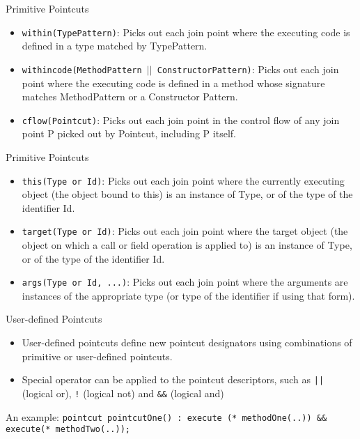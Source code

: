 \documentclass[11pt]{beamer}
\begin{document}
\begin{frame}{Primitive Pointcuts}
  \begin{itemize}
    \item \texttt{within(TypePattern)}:
    Picks out each join point where the executing code is defined in a type matched by TypePattern. 
    \item \texttt{withincode(MethodPattern $||$ ConstructorPattern)}:
    Picks out each join point where the executing code is defined in a method whose signature matches MethodPattern or a Constructor Pattern. 
    \item \texttt{cflow(Pointcut)}:
    Picks out each join point in the control flow of any join point P picked out by Pointcut, including P itself. 
  \end{itemize}
\end{frame}

\begin{frame}{Primitive Pointcuts}
  \begin{itemize}
    \item \texttt{this(Type or Id)}:
    Picks out each join point where the currently executing object (the object bound to this) is an instance of Type, or of the type of the identifier Id. 
    \item \texttt{target(Type or Id)}:
    Picks out each join point where the target object (the object on which a call or field operation is applied to) is an instance of Type, or of the type of the identifier Id.
    \item \texttt{args(Type or Id, ...)}:
    Picks out each join point where the arguments are instances of the appropriate type (or type of the identifier if using that form). 
  \end{itemize}
\end{frame}


\begin{frame}{User-defined Pointcuts}
  \begin{itemize}
    \item User-defined pointcuts define new pointcut designators using combinations of primitive or user-defined pointcuts.
    \item Special operator can be applied to the pointcut descriptors, such as \texttt{||} (logical or), \texttt{!} (logical not) and \texttt{\&\&} (logical and)
  \end{itemize}
  \begin{block}{An example:}
    \texttt{pointcut pointcutOne() : execute (* methodOne(..)) \&\& execute(* methodTwo(..));}
  \end{block}
\end{frame}
\end{document}

